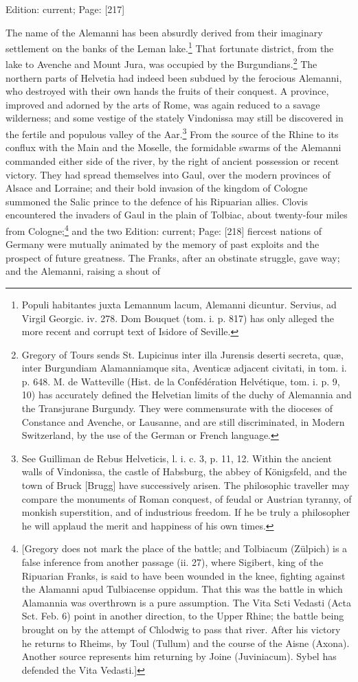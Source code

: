 Edition: current; Page: [217]

The name of the Alemanni has been absurdly derived from their imaginary settlement on the banks of the Leman lake.\footnote{Populi habitantes juxta Lemannum lacum, Alemanni dicuntur. Servius, ad Virgil Georgic. iv. 278. Dom Bouquet (tom. i. p. 817) has only alleged the more recent and corrupt text of Isidore of Seville.} That fortunate district, from the lake to Avenche and Mount Jura, was occupied by the Burgundians.\footnote{Gregory of Tours sends St. Lupicinus inter illa Jurensis deserti secreta, quæ, inter Burgundiam Alamanniamque sita, Aventicæ adjacent civitati, in tom. i. p. 648. M. de Watteville (Hist. de la Confédération Helvétique, tom. i. p. 9, 10) has accurately defined the Helvetian limits of the duchy of Alemannia and the Transjurane Burgundy. They were commensurate with the dioceses of Constance and Avenche, or Lausanne, and are still discriminated, in Modern Switzerland, by the use of the German or French language.} The northern parts of Helvetia had indeed been subdued by the ferocious Alemanni, who destroyed with their own hands the fruits of their conquest. A province, improved and adorned by the arts of Rome, was again reduced to a savage wilderness; and some vestige of the stately Vindonissa may still be discovered in the fertile and populous valley of the Aar.\footnote{See Guilliman de Rebus Helveticis, l. i. c. 3, p. 11, 12. Within the ancient walls of Vindonissa, the castle of Habsburg, the abbey of Königsfeld, and the town of Bruck [Brugg] have successively arisen. The philosophic traveller may compare the monuments of Roman conquest, of feudal or Austrian tyranny, of monkish superstition, and of industrious freedom. If he be truly a philosopher he will applaud the merit and happiness of his own times.} From the source of the Rhine to its conflux with the Main and the Moselle, the formidable swarms of the Alemanni commanded either side of the river, by the right of ancient possession or recent victory. They had spread themselves into Gaul, over the modern provinces of Alsace and Lorraine; and their bold invasion of the kingdom of Cologne summoned the Salic prince to the defence of his Ripuarian allies. Clovis encountered the invaders of Gaul in the plain of Tolbiac, about twenty-four miles from Cologne;\footnote{[Gregory does not mark the place of the battle; and Tolbiacum (Zülpich) is a false inference from another passage (ii. 27), where Sigibert, king of the Ripuarian Franks, is said to have been wounded in the knee, fighting against the Alamanni apud Tulbiacense oppidum. That this was the battle in which Alamannia was overthrown is a pure assumption. The Vita Scti Vedasti (Acta Sct. Feb. 6) point in another direction, to the Upper Rhine; the battle being brought on by the attempt of Chlodwig to pass that river. After his victory he returns to Rheims, by Toul (Tullum) and the course of the Aisne (Axona). Another source represents him returning by Joine (Juviniacum). Sybel has defended the Vita Vedasti.]} and the two Edition: current; Page: [218] fiercest nations of Germany were mutually animated by the memory of past exploits and the prospect of future greatness. The Franks, after an obstinate struggle, gave way; and the Alemanni, raising a shout of 